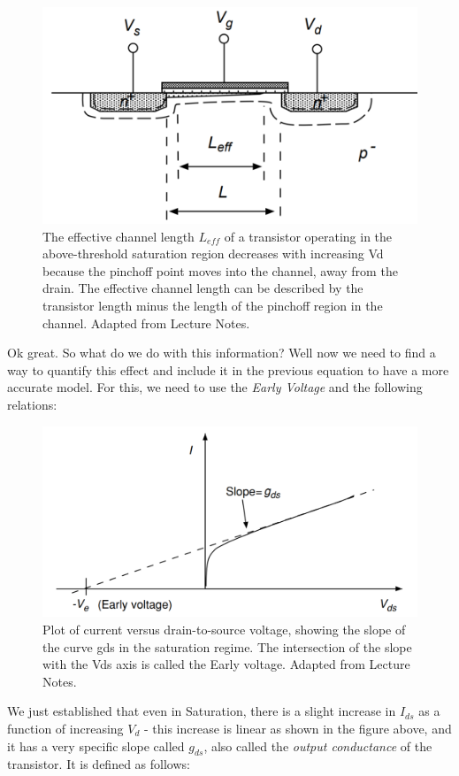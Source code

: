 \begin{figure}[H]
    \centering
    \includegraphics[width=0.7\linewidth]{../../Figures/Early_Effect_Pinchoff_Region.PNG}
    \caption{The effective channel length $L_{eff}$ of a transistor operating in the above-threshold saturation region decreases with increasing Vd because the pinchoff point moves into the channel, away from the drain. The effective channel length can be described by the transistor length minus the length of the pinchoff region in the channel. Adapted from Lecture Notes.}
    \label{fig:pinchoff}
\end{figure}

Ok great. So what do we do with this information? Well now we need to find a way to quantify this effect and include it in the previous equation to have a more accurate model. For this, we need to use the \emph{Early Voltage} and the following relations: 

\begin{figure}[H]
    \centering
    \includegraphics[width=0.7\linewidth]{../../Figures/Early_Voltage.PNG}
    \caption{Plot of current versus drain-to-source voltage, showing the slope of the curve gds in the saturation regime. The intersection of the slope with the Vds axis is called the Early voltage. Adapted from Lecture Notes.}
    \label{fig:basalandcerebellum}
\end{figure}

We just established that even in Saturation, there is a slight increase in $I_{ds}$ as a function of increasing $V_{d}$ - this increase is linear as shown in the figure above, and it has a very specific slope called $g_{ds}$, also called the \emph{output conductance} of the transistor. It is defined as follows: 

